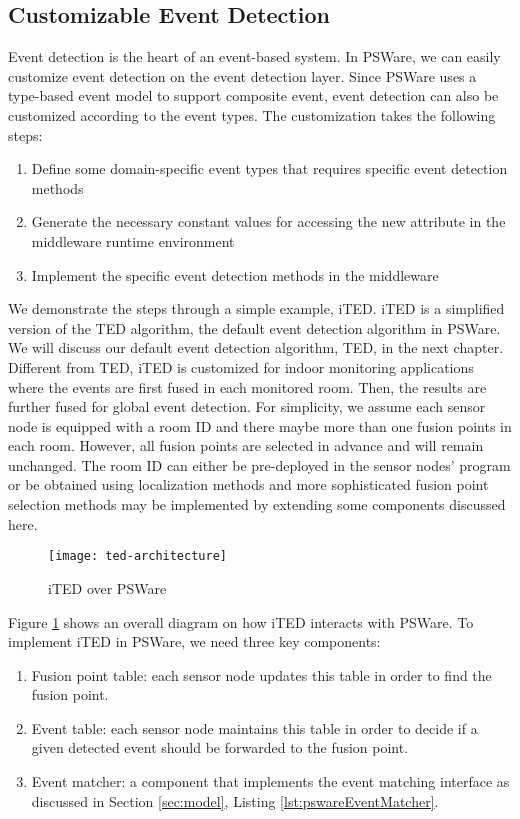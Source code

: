 \subsection{Customizable Event Detection}
Event detection is the heart of an event-based system. In PSWare, we can easily customize event detection on the event detection layer. Since PSWare uses a type-based event model to support composite event, event detection can also be customized according to the event types. The customization takes the following steps:
\begin{enumerate}
\item Define some domain-specific event types that requires specific event detection methods
\item Generate the necessary constant values for accessing the new attribute in the middleware runtime environment
\item Implement the specific event detection methods in the middleware
\end{enumerate}

We demonstrate the steps through a simple example, iTED. iTED is a simplified version of the TED \cite{lai:ted} algorithm, the default event detection algorithm in PSWare. We will discuss our default event detection algorithm, TED, in the next chapter. Different from TED, iTED is customized for indoor monitoring applications where the events are first fused in each monitored room. Then, the results are further fused for global event detection. For simplicity, we assume each sensor node is equipped with a room ID and there maybe more than one fusion points in each room. However, all fusion points are selected in advance and will remain unchanged. The room ID can either be pre-deployed in the sensor nodes' program or be obtained using localization methods and more sophisticated fusion point selection methods may be implemented by extending some components discussed here.

\begin{figure}
\centering
\texttt{[image: ted-architecture]}
\caption{iTED over PSWare}
\label{fig:ted-architecture}
\end{figure}

Figure \ref{fig:ted-architecture} shows an overall diagram on how iTED interacts with PSWare. To implement iTED in PSWare, we need three key components:
\begin{enumerate}
\item Fusion point table: each sensor node updates this table in order to find the fusion point.
\item Event table: each sensor node maintains this table in order to decide if a given detected event should be forwarded to the fusion point.
\item Event matcher: a component that implements the event matching interface as discussed in Section \ref{sec:model}, Listing \ref{lst:pswareEventMatcher}.
\end{enumerate}

